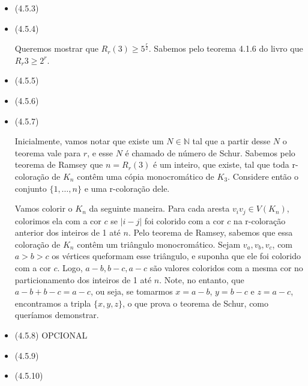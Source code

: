 \documentclass{article}
\begin{document}
\begin{itemize}
\begin{itemize}
		\end{itemize}
	\item (4.5.3)

	\item (4.5.4)

		Queremos mostrar que \(R_r(3) \geq 5^{\frac{r}{2}}\). Sabemos pelo teorema 4.1.6 do livro que \(R_r{3} \geq 2^r\).
	\item (4.5.5)
			\item (4.5.6)
			\item (4.5.7)

				Inicialmente, vamos notar que existe um \(N \in \mathbb{N}\) tal que a partir desse \(N\) o teorema vale para \(r\), e esse \(N\) é chamado de número de
				Schur. Sabemos pelo teorema de Ramsey que \(n = R_r(3)\) é um inteiro, que existe, tal que
				toda r-coloração de \(K_n\) contêm uma cópia monocromático de \(K_3\).
				Considere então o conjunto \(\{1, \dots, n\}\) e uma r-coloração dele.

				Vamos colorir o \(K_n\) da seguinte maneira. Para cada aresta \(v_iv_j \in V(K_n)\), colorimos ela com a cor \(c\) se \(|i - j|\) foi colorido com a cor
				\(c\) na r-coloração anterior dos inteiros de 1 até \(n\). Pelo teorema de Ramsey, sabemos que essa coloração de \(K_n\) contêm um triângulo monocromático.
				Sejam \(v_a, v_b, v_c\), com \(a > b > c\) os vértices queformam esse triângulo, e suponha que ele foi colorido com a cor \(c\). Logo,
				\(a - b, b - c, a - c\) são valores coloridos com a mesma cor no particionamento dos inteiros de 1 até \(n\). Note, no entanto, que 
				\(a - b + b - c = a - c\), ou seja, se tomarmos \(x = a - b\), \(y = b - c\) e \(z = a - c\), encontramos a tripla \(\{x,y,z\}\), o que prova o 
				teorema de Schur, como queríamos demonstrar.

			\item (4.5.8) OPCIONAL
			\item (4.5.9)
			\item (4.5.10)
		\end{itemize}

	
\end{document}
